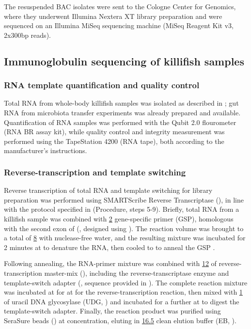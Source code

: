 The resuspended BAC isolates were sent to the Cologne Center for Genomics, where they underwent Illumina Nextera XT library preparation and were sequenced on an Illumina MiSeq sequencing machine (MiSeq Reagent Kit v3, 2x300bp reads).

\subsection{Immunoglobulin sequencing of killifish samples}
\label{sec:methods_molec_igseq}

\subsubsection{RNA template quantification and quality control}
\label{sec:methods_molec_igseq_template}

Total RNA from whole-body killifish samples was isolated as described in ; gut RNA from microbiota transfer experiments \parencite{smith2017microbiota} was already prepared and available. Quantification of RNA samples was performed with the Qubit 2.0 flourometer (RNA BR assay kit), while quality control and integrity measurement was performed using the TapeStation 4200 (RNA tape), both according to the manufacturer's instructions.

\subsubsection{Reverse-transcription and template switching}
\label{sec:methods_molec_igseq_rt}

Reverse transcription of total RNA and template switching for \igseq library preparation was performed using SMARTScribe Reverse Transcriptase (), in line with the protocol specified in \parencite{turchaninova2016igprep} (Procedure, steps 5-9). Briefly,  total RNA from a killifish sample was combined with \ul{2}  gene-specific primer (GSP), homologous with the second \ch exon of \Nfu {} (, designed using  \parencite{untergasser2012primer3}). The reaction volume was brought to a total of \ul{8} with nuclease-free water, and the resulting mixture was incubated for 2 minutes at  to denature the RNA, then cooled to  to anneal the GSP \parencite{turchaninova2016igprep}.

Following annealing, the RNA-primer mixture was combined with \ul{12} of reverse-transcription master-mix (), including the reverse-transcriptase enzyme and template-switch adapter (, sequence provided in \parencite{turchaninova2016igprep}). The complete reaction mixture was incubated at for  at  for the reverse-transcription reaction, then mixed with \ul{1} of uracil DNA glycosylase (UDG, ) and incubated for a further  at  to digest the template-switch adapter. Finally, the reaction product was purified using SeraSure beads () at  concentration, eluting in \ul{16.5} clean elution buffer (EB, ).

